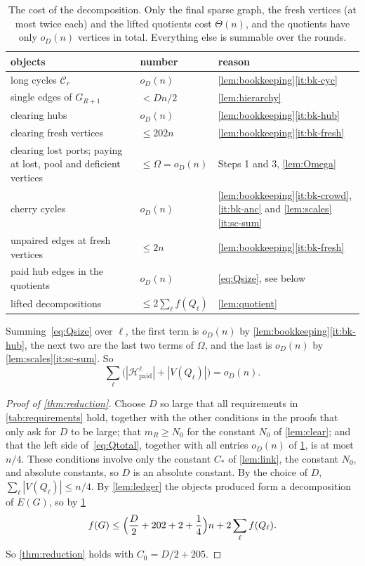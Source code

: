 \documentclass[11pt]{article}
\theoremstyle{definition}
\theoremstyle{remark}
\numberwithin{equation}{section}
\numberwithin{figure}{section}
\numberwithin{table}{section}
\newcommand{\cC}{\mathcal{C}}
\newcommand{\cH}{\mathcal{H}}
\newcommand{\paid}{\mathrm{paid}}
\newcommand{\oD}{o_D(n)}
\begin{document}
\begin{table}[h]
\centering\small
\renewcommand{\arraystretch}{1.15}
\begin{tabular}{@{}p{}lp{}@{}}
\toprule
objects & number & reason\\
\midrule
long cycles $\cC_r$ & $\oD$ & \cref{lem:bookkeeping}\ref{it:bk-cyc}\\
single edges of $G_{R+1}$ & $<Dn/2$ & \cref{lem:hierarchy}\\
clearing hubs & $\oD$ & \cref{lem:bookkeeping}\ref{it:bk-hub}\\
clearing fresh vertices & $\le202n$ & \cref{lem:bookkeeping}\ref{it:bk-fresh}\\
clearing lost ports; paying at lost, pool and deficient vertices & $\le\Omega=\oD$ & Steps 1 and 3, \cref{lem:Omega}\\
cherry cycles & $\oD$ & \cref{lem:bookkeeping}\ref{it:bk-crowd},\ref{it:bk-anc} and \cref{lem:scales}\ref{it:sc-sum}\\
unpaired edges at fresh vertices & $\le2n$ & \cref{lem:bookkeeping}\ref{it:bk-fresh}\\
paid hub edges in the quotients & $\oD$ & \eqref{eq:Qsize}, see below\\
lifted decompositions & $\le2\sum_\ell f(Q_\ell)$ & \cref{lem:quotient}\\
\bottomrule
\end{tabular}
\caption{The cost of the decomposition. Only the final sparse graph, the fresh
vertices (at most twice each) and the lifted quotients cost $\Theta(n)$, and
the quotients have only $\oD$ vertices in total. Everything else is summable
over the rounds.}
\label{tab:costs}
\end{table}

Summing~\eqref{eq:Qsize} over $\ell$, the first term is $\oD$ by
\cref{lem:bookkeeping}\ref{it:bk-hub}, the next two are the last two terms of
$\Omega$, and the last is $\oD$ by \cref{lem:scales}\ref{it:sc-sum}. So
\begin{equation}\label{eq:Qtotal}
\sum_\ell\bigl(|\cH^\ell_\paid|+|V(Q_\ell)|\bigr)=\oD.
\end{equation}

\begin{proof}[Proof of \cref{thm:reduction}]
Choose $D$ so large that all requirements in \cref{tab:requirements} hold,
together with the other conditions in the proofs that only ask for $D$ to be
large; that $m_R\ge N_0$ for the constant $N_0$ of \cref{lem:clear}; and that
the left side of~\eqref{eq:Qtotal}, together with all entries $\oD$ of
\cref{tab:costs}, is at most $n/4$. These conditions involve only the constant
$C_*$ of \cref{lem:link}, the constant $N_0$, and absolute constants, so $D$ is
an absolute constant. By the choice of $D$, $\sum_\ell|V(Q_\ell)|\le n/4$. By
\cref{lem:ledger} the objects produced form a decomposition of $E(G)$, so by
\cref{tab:costs}
\[
f(G)\le\Bigl(\frac D2+202+2+\frac14\Bigr)n+2\sum_\ell f(Q_\ell).
\]
So \cref{thm:reduction} holds with $C_0=D/2+205$.
\end{proof}
\end{document}
